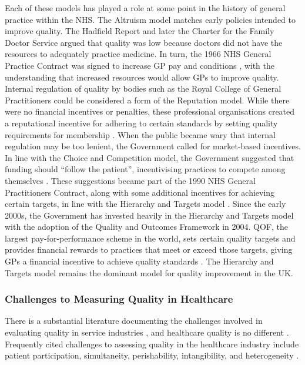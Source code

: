 \documentclass[12pt]{article}
\begin{document}
Each of these models has played a role at some point in the history of general practice within the NHS. The Altruism model matches early policies intended to improve quality. The Hadfield Report \citep{hadfieldFieldSurveyGeneral1953} and later the Charter for the Family Doctor Service \citep{gmscommitteeCharterGeneralPractice1965} argued that quality was low because doctors did not have the resources to adequately practice medicine. In turn, the 1966 NHS General Practice Contract was signed to increase GP pay and conditions \citep{gillamFamilyDoctorCharter2017}, with the understanding that increased resources would allow GPs to improve quality. Internal regulation of quality by bodies such as the Royal College of General Practitioners could be considered a form of the Reputation model. While there were no financial incentives or penalties, these professional organisations created a reputational incentive for adhering to certain standards by setting quality requirements for membership \citep{royalcollegeofgeneralpractitionersHistoryCollege}. When the public became wary that internal regulation may be too lenient, the Government called for market-based incentives. In line with the Choice and Competition model, the Government suggested that funding should ``follow the patient'', incentivising practices to compete among themselves \citep{bakerQualityInitiativeRoyal1989}. These suggestions became part of the 1990 NHS General Practitioners Contract, along with some additional incentives for achieving certain targets, in line with the Hierarchy and Targets model \citep{williamsAllChangeNHS1993}. Since the early 2000s, the Government has invested heavily in the Hierarchy and Targets model with the adoption of the Quality and Outcomes Framework in 2004. QOF, the largest pay-for-performance scheme in the world, sets certain quality targets and provides financial rewards to practices that meet or exceed those targets, giving GPs a financial incentive to achieve quality standards \citep{shekelleNewContractGeneral2003}. The Hierarchy and Targets model remains the dominant model for quality improvement in the UK.


\subsubsection{Challenges to Measuring Quality in Healthcare}

There is a substantial literature documenting the challenges involved in evaluating quality in service industries \citep{proctorCanServicesMarketing1998}, and healthcare quality is no different \citep{mosadeghradFactorsAffectingMedical2014,mosadeghradFactorsInfluencingHealthcare2014, chengInnovativeFrameworkHealth1999}. Frequently cited challenges to assessing quality in the healthcare industry include patient participation, simultaneity, perishability, intangibility, and heterogeneity \citep{ozcanQuantitativeMethodsHealth2005}.
\end{document}
